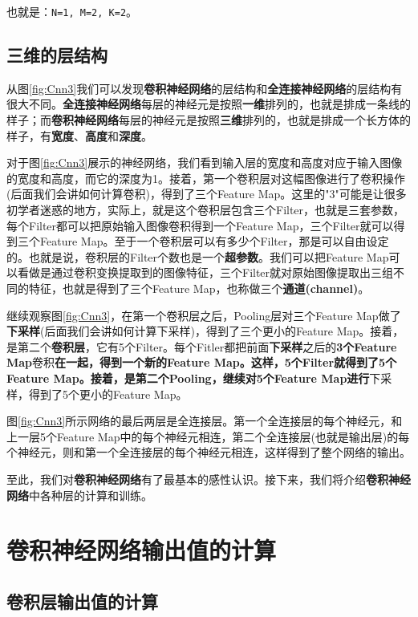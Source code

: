 也就是：\texttt{N=1,\ M=2,\ K=2}。

\subsection{三维的层结构}

从图\ref{fig:Cnn3}我们可以发现\textbf{卷积神经网络}的层结构和\textbf{全连接神经网络}的层结构有很大不同。\textbf{全连接神经网络}每层的神经元是按照\textbf{一维}排列的，也就是排成一条线的样子；而\textbf{卷积神经网络}每层的神经元是按照\textbf{三维}排列的，也就是排成一个长方体的样子，有\textbf{宽度}、\textbf{高度}和\textbf{深度}。

对于图\ref{fig:Cnn3}展示的神经网络，我们看到输入层的宽度和高度对应于输入图像的宽度和高度，而它的深度为1。接着，第一个卷积层对这幅图像进行了卷积操作(后面我们会讲如何计算卷积)，得到了三个Feature Map。这里的"3"可能是让很多初学者迷惑的地方，实际上，就是这个卷积层包含三个Filter，也就是三套参数，每个Filter都可以把原始输入图像卷积得到一个Feature Map，三个Filter就可以得到三个Feature Map。至于一个卷积层可以有多少个Filter，那是可以自由设定的。也就是说，卷积层的Filter个数也是一个\textbf{超参数}。我们可以把Feature Map可以看做是通过卷积变换提取到的图像特征，三个Filter就对原始图像提取出三组不同的特征，也就是得到了三个Feature Map，也称做三个\textbf{通道(channel)}。

继续观察图\ref{fig:Cnn3}，在第一个卷积层之后，Pooling层对三个Feature Map做了\textbf{下采样}(后面我们会讲如何计算下采样)，得到了三个更小的Feature Map。接着，是第二个\textbf{卷积层}，它有5个Filter。每个Fitler都把前面\textbf{下采样}之后的\textbf{3个Feature Map}卷积\textbf{在一起，得到一个新的Feature Map。这样，5个Filter就得到了5个Feature Map。接着，是第二个Pooling，继续对5个Feature Map进行}下采样，得到了5个更小的Feature Map。

图\ref{fig:Cnn3}所示网络的最后两层是全连接层。第一个全连接层的每个神经元，和上一层5个Feature Map中的每个神经元相连，第二个全连接层(也就是输出层)的每个神经元，则和第一个全连接层的每个神经元相连，这样得到了整个网络的输出。

至此，我们对\textbf{卷积神经网络}有了最基本的感性认识。接下来，我们将介绍\textbf{卷积神经网络}中各种层的计算和训练。


\section{卷积神经网络输出值的计算}\label{Cnn:4}
\subsection{卷积层输出值的计算}\label{Cnn:5}

